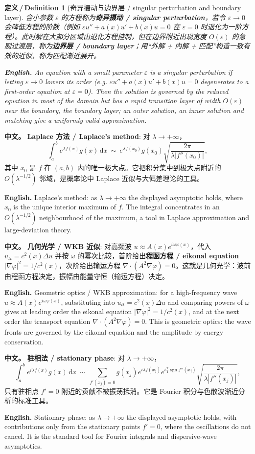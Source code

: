 \documentclass[UTF8,11pt,a4paper]{ctexart}
\newcommand{\APS}[2]{\par\noindent\textbf{中文。} #1\par\noindent\textbf{English.} #2\par\smallskip}
\newcommand{\EN}[1]{\par\noindent \textbf{English.} #1\par}
\newtheorem{definition}{定义\,/\,Definition}[section]
\newcommand{\dd}{\mathrm{d}}
\begin{document}
\begin{definition}[奇异摄动与边界层 / singular perturbation and boundary layer]\label{def:singular}
含小参数 $\varepsilon$ 的方程称为\textbf{奇异摄动 / singular perturbation}，若令 $\varepsilon\to0$ 会降低方程的阶数（例如 $\varepsilon u''+a(x)u'+b(x)u=0$ 在 $\varepsilon=0$ 时退化为一阶方程）。此时解在大部分区域由退化方程控制，但在边界附近出现宽度 $O(\varepsilon)$ 的急剧过渡层，称为\textbf{边界层 / boundary layer}；用``外解 + 内解 + 匹配''构造一致有效的近似，称为匹配渐近展开。
\EN{An equation with a small parameter $\varepsilon$ is a singular perturbation if letting $\varepsilon\to0$ lowers its order (e.g. $\varepsilon u''+a(x)u'+b(x)u=0$ degenerates to a first-order equation at $\varepsilon=0$). Then the solution is governed by the reduced equation in most of the domain but has a rapid transition layer of width $O(\varepsilon)$ near the boundary, the boundary layer; an outer solution, an inner solution and matching give a uniformly valid approximation.}
\end{definition}

\APS{\textbf{Laplace 方法 / Laplace's method}: 对 $\lambda\to+\infty$，
\[
\int_a^b e^{\lambda f(x)}g(x)\,\dd x\ \sim\ e^{\lambda f(x_0)}g(x_0)\sqrt{\frac{2\pi}{\lambda|f''(x_0)|}},
\]
其中 $x_0$ 是 $f$ 在 $(a,b)$ 内的唯一极大点。它把积分集中到极大点附近的 $O(\lambda^{-1/2})$ 邻域，是概率论中 Laplace 近似与大偏差理论的工具。}{Laplace's method: as $\lambda\to+\infty$ the displayed asymptotic holds, where $x_0$ is the unique interior maximum of $f$. The integral concentrates in an $O(\lambda^{-1/2})$ neighbourhood of the maximum, a tool in Laplace approximation and large-deviation theory.}

\APS{\textbf{几何光学 / WKB 近似}: 对高频波 $u\approx A(x)e^{i\omega\varphi(x)}$，代入 $u_{tt}=c^2(x)\Delta u$ 并按 $\omega$ 的幂次比较，首阶给出\textbf{程函方程 / eikonal equation} $|\nabla\varphi|^2=1/c^2(x)$，次阶给出输运方程 $\nabla\cdot(A^2\nabla\varphi)=0$。这就是几何光学：波前由程函方程决定，振幅由能量守恒（输运方程）决定。}{Geometric optics / WKB approximation: for a high-frequency wave $u\approx A(x)e^{i\omega\varphi(x)}$, substituting into $u_{tt}=c^2(x)\Delta u$ and comparing powers of $\omega$ gives at leading order the eikonal equation $|\nabla\varphi|^2=1/c^2(x)$, and at the next order the transport equation $\nabla\cdot(A^2\nabla\varphi)=0$. This is geometric optics: the wave fronts are governed by the eikonal equation and the amplitude by energy conservation.}

\APS{\textbf{驻相法 / stationary phase}: 对 $\lambda\to+\infty$，
\[
\int_a^b e^{i\lambda f(x)}g(x)\,\dd x\ \sim\ \sum_{f'(x_j)=0}g(x_j)e^{i\lambda f(x_j)}e^{i\frac\pi4\operatorname{sgn}f''(x_j)}\sqrt{\frac{2\pi}{\lambda|f''(x_j)|}} ,
\]
只有驻相点 $f'=0$ 附近的贡献不被振荡抵消。它是 Fourier 积分与色散波渐近分析的标准工具。}{Stationary phase: as $\lambda\to+\infty$ the displayed asymptotic holds, with contributions only from the stationary points $f'=0$, where the oscillations do not cancel. It is the standard tool for Fourier integrals and dispersive-wave asymptotics.}
\end{document}
